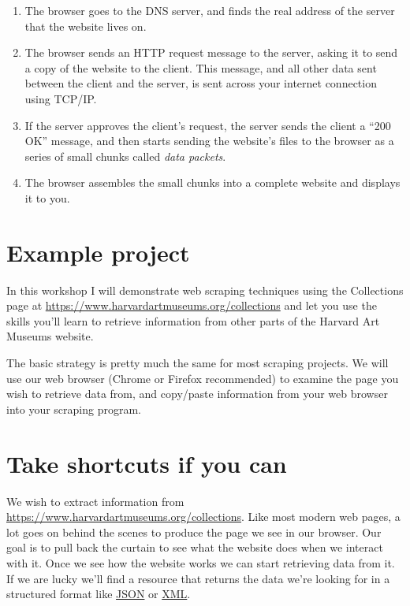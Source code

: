 \documentclass[
]{book}
\providecommand{\tightlist}{%
  \setlength{\itemsep}{0pt}\setlength{\parskip}{0pt}}
\begin{document}
\begin{enumerate}
\def\labelenumi{\arabic{enumi}.}
\tightlist
\item
  The browser goes to the DNS server, and finds the real address of the server that the website lives on.
\item
  The browser sends an HTTP request message to the server, asking it to send a copy of the website to the client. This message, and all other data sent between the client and the server, is sent across your internet connection using TCP/IP.
\item
  If the server approves the client's request, the server sends the client a ``200 OK'' message, and then starts sending the website's files to the browser as a series of small chunks called \emph{data packets}.
\item
  The browser assembles the small chunks into a complete website and displays it to you.
\end{enumerate}

\hypertarget{example-project}{%
\section{Example project}\label{example-project}}

In this workshop I will demonstrate web scraping techniques using the
Collections page at
\url{https://www.harvardartmuseums.org/collections} and let you use
the skills you'll learn to retrieve information from other parts of
the Harvard Art Museums website.

The basic strategy is pretty much the same for most scraping projects.
We will use our web browser (Chrome or Firefox recommended) to examine
the page you wish to retrieve data from, and copy/paste information
from your web browser into your scraping program.

\hypertarget{take-shortcuts-if-you-can}{%
\section{Take shortcuts if you can}\label{take-shortcuts-if-you-can}}

We wish to extract information from
\url{https://www.harvardartmuseums.org/collections}. Like most
modern web pages, a lot goes on behind the scenes to produce the page
we see in our browser. Our goal is to pull back the curtain to see
what the website does when we interact with it. Once we see how the
website works we can start retrieving data from it. If we are lucky
we'll find a resource that returns the data we're looking for in a
structured format like \href{https://json.org/}{JSON} or
\href{https://en.wikipedia.org/wiki/XML}{XML}.
\end{document}
